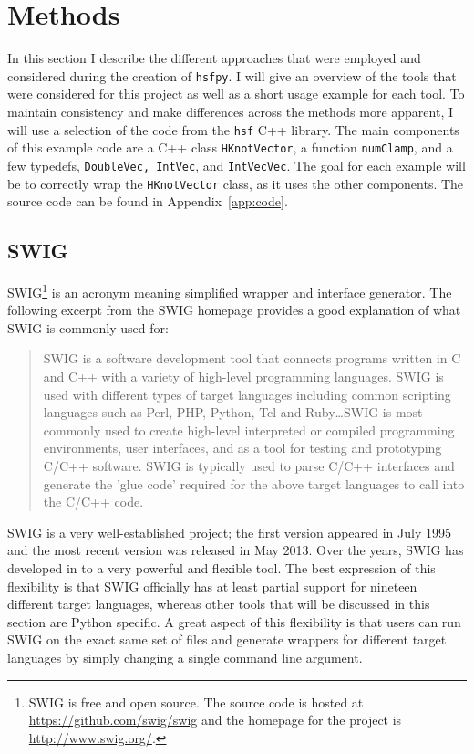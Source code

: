 
\section{Methods} \label{sec:methods}

In this section I describe the different approaches that were employed and considered during the creation of \texttt{hsfpy}. I will give an overview of the tools that were considered for this project as well as a short usage example for each tool. To maintain consistency and make differences across the methods more apparent, I will use a selection of the code from the \texttt{hsf} C++ library. The main components of this example code are a C++ class \texttt{HKnotVector}, a function \texttt{numClamp}, and a few typedefs, \texttt{DoubleVec, IntVec}, and \texttt{IntVecVec}. The goal for each example will be to correctly wrap the \texttt{HKnotVector} class, as it uses the other components. The source code can be found in Appendix~\ref{app:code}.

\subsection{SWIG} \label{sub:swig}

  SWIG\footnote{SWIG is free and open source. The source code is hosted at \url{https://github.com/swig/swig} and the homepage for the project is \url{http://www.swig.org/}.} is an acronym meaning simplified wrapper and interface generator. The following excerpt from the SWIG homepage provides a good explanation of what SWIG is commonly used for:

  \begin{quote}
    SWIG is a software development tool that connects programs written in C and C++ with a variety of high-level programming languages. SWIG is used with different types of target languages including common scripting languages such as Perl, PHP, Python, Tcl and Ruby\ldots SWIG is most commonly used to create high-level interpreted or compiled programming environments, user interfaces, and as a tool for testing and prototyping C/C++ software. SWIG is typically used to parse C/C++ interfaces and generate the 'glue code' required for the above target languages to call into the C/C++ code.
  \end{quote}
  \mainstretch{}

  \noindent  SWIG is a very well-established project; the first version appeared in July 1995 and the most recent version was released in May 2013. Over the years, SWIG has developed in to a very powerful and flexible tool. The best expression of this flexibility is that SWIG officially has at least partial support for nineteen different target languages, whereas other tools that will be discussed in this section are Python specific. A great aspect of this flexibility is that users can run SWIG on the exact same set of files and generate wrappers for different target languages by simply changing a single command line argument.

